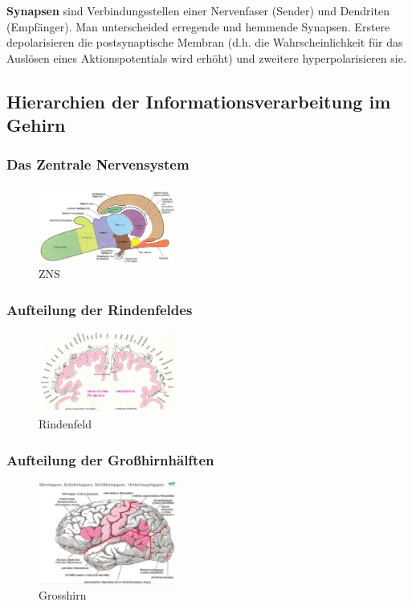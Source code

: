 \textbf{Synapsen} sind Verbindungsstellen einer Nervenfaser (Sender) und Dendriten (Empfänger). Man unterscheided erregende und hemmende Synapsen. Erstere depolarisieren die postsynaptische Membran (d.h. die Wahrscheinlichkeit für das Auslösen eines Aktionspotentials wird erhöht) und zweitere hyperpolarisieren sie.
\subsection{Hierarchien der Informationsverarbeitung im Gehirn}
\subsubsection{Das Zentrale Nervensystem}
\begin{figure}[h!]
	\centering
	\includegraphics[width=0.4\textwidth]{figures/ch07_zns.png}
	\caption{ZNS}
	\label{zns}
\end{figure}
\subsubsection{Aufteilung der Rindenfeldes}
\begin{figure}[h!]
	\centering
	\includegraphics[width=0.4\textwidth]{figures/ch07_rindenfeld.png}
	\caption{Rindenfeld}
	\label{rindenfeld}
\end{figure}
\subsubsection{Aufteilung der Großhirnhälften}
\begin{figure}[h!]
	\centering
	\includegraphics[width=0.4\textwidth]{figures/ch07_grosshirn.png}
	\caption{Grosshirn}
	\label{grosshirn}
\end{figure}

